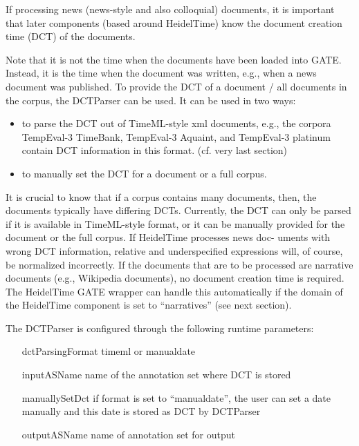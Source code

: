 If processing news (news-style and also colloquial) documents, it is important
that later components (based around HeidelTime) know the document creation time
(DCT) of the documents.

Note that it is not the time when the documents have been loaded into GATE.
Instead, it is the time when the document was written, e.g., when a news
document was published. To provide the DCT of a document / all documents in the
corpus, the DCTParser can be used. It can be used in two ways:

\begin{itemize}
\item to parse the DCT out of TimeML-style xml documents, e.g., the corpora
TempEval-3 TimeBank, TempEval-3 Aquaint, and TempEval-3 platinum
contain DCT information in this format. (cf. very last section)
\item to manually set the DCT for a document or a full corpus.
\end{itemize}

It is crucial to know that if a corpus contains many documents,
then, the documents typically have differing DCTs. Currently, the DCT can
only be parsed if it is available in TimeML-style format, or it can be manually
provided for the document or the full corpus. If HeidelTime processes news doc-
uments with wrong DCT information, relative and underspecified expressions
will, of course, be normalized incorrectly.
If the documents that are to be processed are narrative documents (e.g.,
Wikipedia documents), no document creation time is required. The HeidelTime
GATE wrapper can handle this automatically if the domain of the HeidelTime
component is set to ``narratives'' (see next section).

The DCTParser is configured through the following runtime parameters:
\begin{itemize}
\item[dctParsingFormat] timeml or manualdate
\item[inputASName] name of the annotation set where DCT is stored
\item[manuallySetDct] if format is set to ``manualdate'', the user can set a date
manually and this date is stored as DCT by DCTParser
\item[outputASName] name of annotation set for output
\end{itemize}

